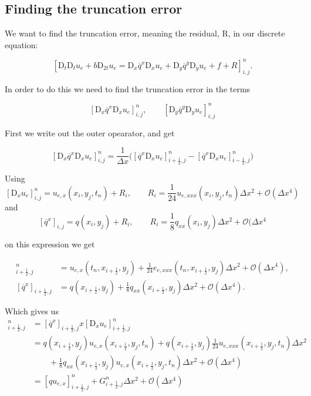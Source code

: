 \documentclass[a4paper, 11pt, notitlepage, english]{article}
\newcommand{\D}{\mbox{D}}
\begin{document}
\subsection*{Finding the truncation error}
We want to find the truncation error, meaning the residual, R, in our discrete equation:

$$[\D_t\D_t u_e + b\D_{2t}u_e = \D_x \overline{q}^{x}\D_x u_e + \D_y \overline{q}^y \D_y u_e + f+ R]^{n}_{i,j}.$$

In order to do this we need to find the truncation error in the terms 

$$[\D_x \overline{q}^{x}\D_x u_e]^{n}_{i,j}, \qquad [\D_y \overline{q}^y \D_y u_e]^{n}_{i,j}$$

First we write out the outer opearator, and get

$$[\D_x \overline{q}^{x}\D_x u_e]^{n}_{i,j} = \frac{1}{\Delta x}\big([\overline{q}^{x}\D_x u_e]^n_{i+\frac{1}{2},j} - [\overline{q}^{x}\D_x u_e]^n_{i-\frac{1}{2},j}\big)$$

Using 
\begin{equation}\label{eq:Dx}
 [\D_xu_e]^n_{i,j} = u_{e,x}(x_i,y_j,t_n) + R_i, \qquad R_i = \frac{1}{24}u_{e,xxx}(x_i,y_j,t_n)\Delta x^2+ \mathcal{O}(\Delta x^4)
\end{equation}
and
\begin{equation}\label{eq:arithmetic}
 [\overline{q}^{x}]_{i,j} = q(x_i,y_j) + R_i, \qquad R_i = \frac{1}{8} q_{xx}(x_i,y_j) \Delta x^2 + \mathcal{O}(\Delta x^4
\end{equation}


on this expression we get

\begin{align*}
[\D_xu_e]^n_{i+\frac{1}{2},j} &= u_{e,x}(t_n,x_{i+\frac{1}{2}},y_j) + \frac{1}{24}e_{e,xxx}(t_n,x_{i+\frac{1}{2}},y_j)\Delta x^2 + \mathcal{O}(\Delta x^4), \\ 
[\overline{q}^x]_{i+\frac{1}{2},j} &= q(x_{i+\frac{1}{2}},y_j) + \frac{1}{8}q_{xx}(x_{i+\frac{1}{2}},y_j)\Delta x^2 + \mathcal{O}(\Delta x^4).
\end{align*}

Which gives us
\begin{align*}
[\overline{q}^x\D_xu_e]^n_{i+\frac{1}{2},j} &= [\overline{q}^x]_{i+\frac{1}{2},j} x [\D_xu_e]^n_{i+\frac{1}{2},j} \\
&=q(x_{i+\frac{1}{2}},y_j)u_{e,x}(x_{i+\frac{1}{2}},y_j,t_n)+q(x_{i+\frac{1}{2}},y_j)\frac{1}{24}u_{e,xxx}(x_{i+\frac{1}{2}},y_j,t_n)\Delta x^2 \\
&\qquad + \frac{1}{8}q_{xx}(x_{i+\frac{1}{2}},y_j)u_{e,x}(x_{i+\frac{1}{2}},y_j,t_n)\Delta x^2 + \mathcal{O}(\Delta x^4)\\
&= [qu_{e,x}]^n_{i+\frac{1}{2},j} + G^n_{i+\frac{1}{2},j}\Delta x^2 + \mathcal{O}(\Delta x^4)
\end{align*}
\end{document}
